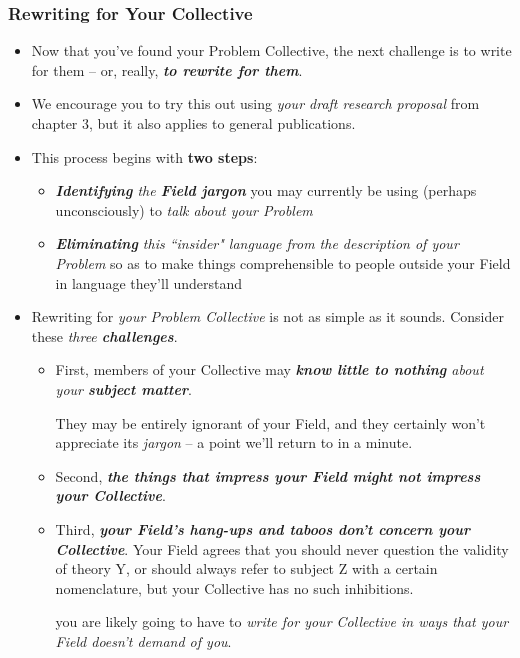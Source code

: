 \documentclass[11pt]{article}
\begin{document}
\subsubsection{Rewriting for Your Collective}
\begin{itemize}
\item Now that you’ve found your Problem Collective, the next challenge is to write for them -- or, really, \emph{\textbf{to rewrite for them}}.

\item We encourage you to try this out using \emph{your draft research proposal} from chapter 3, but it also applies to general publications.

\item This process begins with \textbf{two steps}:
\begin{itemize}
\item \emph{\textbf{Identifying} the \textbf{Field jargon}} you may currently be using (perhaps unconsciously) to \emph{talk about your Problem}
\item \emph{\textbf{Eliminating} this ``insider" language from the description of your Problem} so as to make things comprehensible to people outside your Field in language they’ll understand
\end{itemize}

\item Rewriting for \emph{your Problem Collective} is not as simple as it sounds. Consider these \emph{three \textbf{challenges}}. 
\begin{itemize}
\item First, members of your Collective may \emph{\textbf{know little to nothing} about your \textbf{subject matter}}. 

They may be entirely ignorant of your Field, and they certainly won’t appreciate its \emph{jargon} -- a point we’ll return to in a minute.

\item Second, \emph{\textbf{the things that impress your Field might not impress your Collective}}. 

\item Third, \emph{\textbf{your Field’s hang-ups and taboos don’t concern your Collective}}. Your Field agrees that you should never question the validity of theory Y, or should always refer to subject Z with a certain nomenclature, but your Collective has no such inhibitions.

you are likely going to have to \emph{write for your Collective in ways that your Field doesn’t demand of you}.
\end{itemize} 


\end{itemize}
\end{document}
